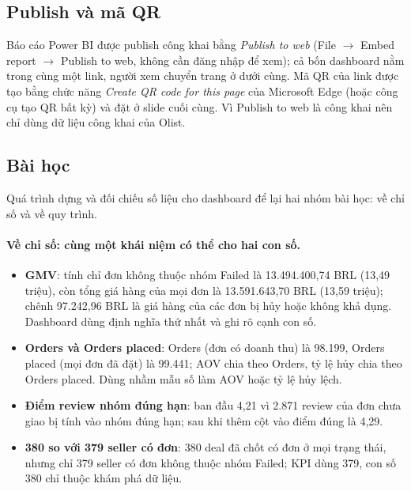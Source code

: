 \subsection{Publish và mã QR}\label{sec:dash-publish}
Báo cáo Power BI được publish công khai bằng \emph{Publish to web} (File $\rightarrow$ Embed report $\rightarrow$ Publish to web, không cần đăng nhập để xem); cả bốn dashboard nằm trong cùng một link, người xem chuyển trang ở dưới cùng. Mã QR của link được tạo bằng chức năng \emph{Create QR code for this page} của Microsoft Edge (hoặc công cụ tạo QR bất kỳ) và đặt ở slide cuối cùng. Vì Publish to web là công khai nên chỉ dùng dữ liệu công khai của Olist.


\subsection{Bài học}\label{sec:bai-hoc}
Quá trình dựng và đối chiếu số liệu cho dashboard để lại hai nhóm bài học: về chỉ số và về quy trình.

\paragraph{Về chỉ số: cùng một khái niệm có thể cho hai con số.}
\begin{itemize}
  \item \textbf{GMV}: tính chỉ đơn không thuộc nhóm Failed là 13.494.400,74 BRL (13,49 triệu), còn tổng giá hàng của mọi đơn là 13.591.643,70 BRL (13,59 triệu); chênh 97.242,96 BRL là giá hàng của các đơn bị hủy hoặc không khả dụng. Dashboard dùng định nghĩa thứ nhất và ghi rõ cạnh con số.
  \item \textbf{Orders và Orders placed}: Orders (đơn có doanh thu) là 98.199, Orders placed (mọi đơn đã đặt) là 99.441; AOV chia theo Orders, tỷ lệ hủy chia theo Orders placed. Dùng nhầm mẫu số làm AOV hoặc tỷ lệ hủy lệch.
  \item \textbf{Điểm review nhóm đúng hạn}: ban đầu 4,21 vì 2.871 review của đơn chưa giao bị tính vào nhóm đúng hạn; sau khi thêm cột  vào  điểm đúng là 4,29.
  \item \textbf{380 so với 379 seller có đơn}: 380 deal đã chốt có đơn ở mọi trạng thái, nhưng chỉ 379 seller có đơn không thuộc nhóm Failed; KPI dùng 379, con số 380 chỉ thuộc khám phá dữ liệu.
\end{itemize}

